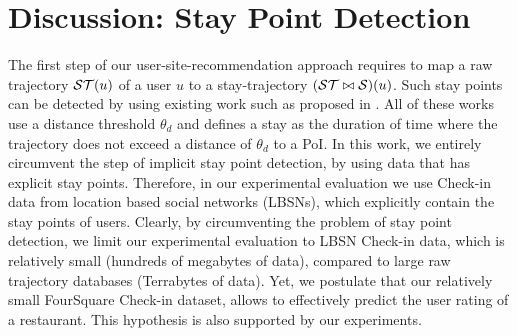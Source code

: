 \section{Discussion: Stay Point Detection}\label{sec:stay}
The first step of our user-site-recommendation approach requires to map a raw trajectory $\mathcal{ST}(u)$ of a user $u$ to a stay-trajectory $(\mathcal{ST}\bowtie\mathcal{S})(u)$. Such stay points can be detected by using existing work such as proposed in \cite{li2008mining,zheng2009mining,zheng2010geolife,xiao2010finding}. All of these works use a distance threshold $\theta_{d}$ and defines a stay as the duration of time where the trajectory does not exceed a distance of $\theta_{d}$ to a PoI. In this work, we entirely circumvent the step of implicit stay point detection, by using data that has explicit stay points. Therefore, in our experimental evaluation we use Check-in data from location based social networks (LBSNs), which explicitly contain the stay points of users. Clearly, by circumventing the problem of stay point detection, we limit our experimental evaluation to LBSN Check-in data, which is relatively small (hundreds of megabytes of data), compared to large raw trajectory databases (Terrabytes of data).
Yet, we postulate that our relatively small FourSquare Check-in dataset, allows to effectively predict the user rating of a restaurant. This hypothesis is also supported by our experiments. 
%
